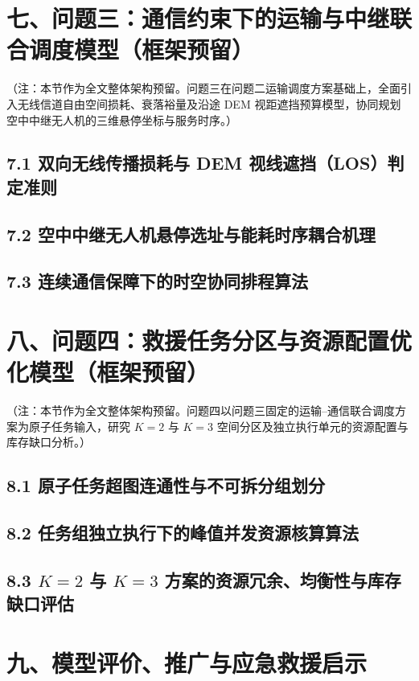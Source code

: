 \documentclass[withoutpreface,bwprint]{format}
\begin{document}
\section{七、问题三：通信约束下的运输与中继联合调度模型（框架预留）}
{\kaishu （注：本节作为全文整体架构预留。问题三在问题二运输调度方案基础上，全面引入无线信道自由空间损耗、衰落裕量及沿途 DEM 视距遮挡预算模型，协同规划空中中继无人机的三维悬停坐标与服务时序。）}

\subsection{7.1 双向无线传播损耗与 DEM 视线遮挡（LOS）判定准则}
\subsection{7.2 空中中继无人机悬停选址与能耗时序耦合机理}
\subsection{7.3 连续通信保障下的时空协同排程算法}



\section{八、问题四：救援任务分区与资源配置优化模型（框架预留）}
{\kaishu （注：本节作为全文整体架构预留。问题四以问题三固定的运输--通信联合调度方案为原子任务输入，研究 $K=2$ 与 $K=3$ 空间分区及独立执行单元的资源配置与库存缺口分析。）}

\subsection{8.1 原子任务超图连通性与不可拆分组划分}
\subsection{8.2 任务组独立执行下的峰值并发资源核算算法}
\subsection{\texorpdfstring{8.3 $K=2$ 与 $K=3$ 方案的资源冗余、均衡性与库存缺口评估}{8.3 K=2 与 K=3 方案的资源冗余、均衡性与库存缺口评估}}



\section{九、模型评价、推广与应急救援启示}
\end{document}
